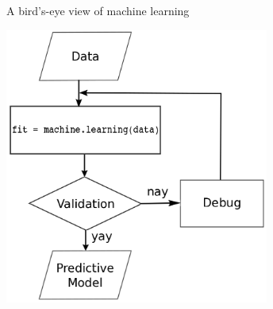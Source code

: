 \documentclass[pdf]{beamer}
\begin{document}
\begin{frame}{A bird's-eye view of machine learning}
\begin{center}
	\includegraphics[width=0.65\textwidth]{flowChart.png}
\end{center}
\end{frame}
\end{document}
